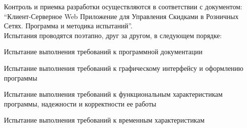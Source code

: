 Контроль и приемка разработки осуществляются в соответствии с документом: 
``Клиент-Серверное Web Приложение для Управления Скидками в Розничных Сетях. 
Программа и методика испытаний''. \\
Испытания проводятся поэтапно, друг за другом, в следующем порядке:
\begin{my_enumerate}
	\item Испытание выполнения требований к программной документации
	\item Испытание выполнения требований к графическому интерфейсу и оформлению программы
	\item Испытание выполнения требований к функциональным характеристикам программы, надежности и корректности ее работы
	\item Испытание выполнения требований к временным характеристикам
\end{my_enumerate}
